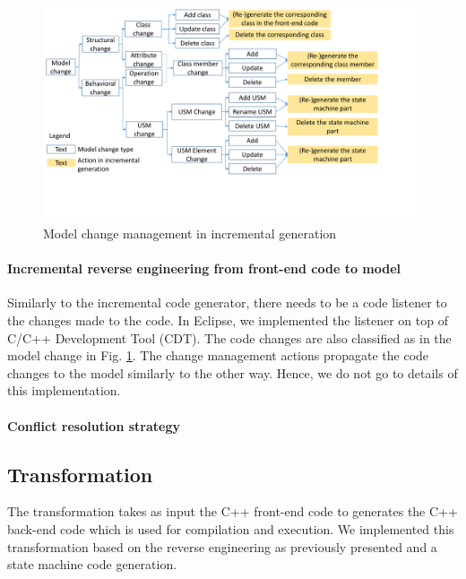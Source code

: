 \begin{figure}
	\centering
	\includegraphics[clip, trim=0.2cm 4cm 4.0cm 0.2cm, width=1\columnwidth]{figures/modelchange.pdf}
	\caption{Model change management in incremental generation} 
	\label{fig:modelchange}
\end{figure}

\noindent
\paragraph{Incremental reverse engineering from front-end code to model}
Similarly to the incremental code generator, there needs to be a code listener to the changes made to the code.
In Eclipse, we implemented the listener on top of C/C++ Development Tool (CDT).
The code changes are also classified as in the model change in Fig. \ref{fig:modelchange}.
The change management actions propagate the code changes to the model similarly to the other way.
Hence, we do not go to details of this implementation. 


\noindent
\paragraph{Conflict resolution strategy}


\subsection{Transformation}
The transformation takes as input the C++ front-end code to generates the C++ back-end code which is used for compilation and execution.
We implemented this transformation based on the reverse engineering as previously presented and a state machine code generation. 


